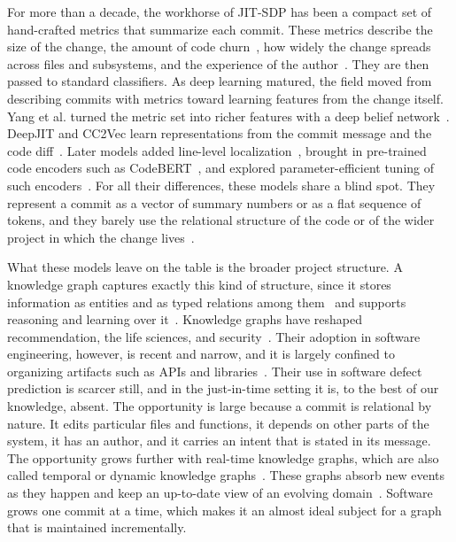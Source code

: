 \documentclass[final,5p,times,twocolumn]{elsarticle}
\theoremstyle{plain}
\begin{document}
For more than a decade, the workhorse of JIT-SDP has been a compact set of hand-crafted metrics that summarize each commit. These metrics describe the size of the change, the amount of code churn~\cite{nagappan2005use}, how widely the change spreads across files and subsystems, and the experience of the author~\cite{kamei2013large,mcintosh2018fix}. They are then passed to standard classifiers. As deep learning matured, the field moved from describing commits with metrics toward learning features from the change itself. Yang et al. turned the metric set into richer features with a deep belief network~\cite{yang2015deep}. DeepJIT and CC2Vec learn representations from the commit message and the code diff~\cite{hoang2019deepjit,hoang2020cc2vec}. Later models added line-level localization~\cite{pornprasit2021jitline,pornprasit2023deeplinedp}, brought in pre-trained code encoders such as CodeBERT~\cite{ni2022best,jiang2025bicc}, and explored parameter-efficient tuning of such encoders~\cite{abutalib2024parameter}. For all their differences, these models share a blind spot. They represent a commit as a vector of summary numbers or as a flat sequence of tokens, and they barely use the relational structure of the code or of the wider project in which the change lives~\cite{bryan2023graph,zhao2023systematic}.

What these models leave on the table is the broader project structure. A knowledge graph captures exactly this kind of structure, since it stores information as entities and as typed relations among them~\cite{hogan2021knowledge,ji2022survey} and supports reasoning and learning over it~\cite{nickel2016review}. Knowledge graphs have reshaped recommendation, the life sciences, and security~\cite{wang2019kgat,maclean2021knowledge,zhao2024survey}. Their adoption in software engineering, however, is recent and narrow, and it is largely confined to organizing artifacts such as APIs and libraries~\cite{liu2023recommending}. Their use in software defect prediction is scarcer still, and in the just-in-time setting it is, to the best of our knowledge, absent. The opportunity is large because a commit is relational by nature. It edits particular files and functions, it depends on other parts of the system, it has an author, and it carries an intent that is stated in its message. The opportunity grows further with real-time knowledge graphs, which are also called temporal or dynamic knowledge graphs~\cite{zhang2024survey,cai2024survey}. These graphs absorb new events as they happen and keep an up-to-date view of an evolving
domain~\cite{trivedi2017knowevolve,goel2020diachronic}. Software grows one commit at a time, which makes it an almost ideal subject for a graph that is maintained incrementally.
\end{document}
